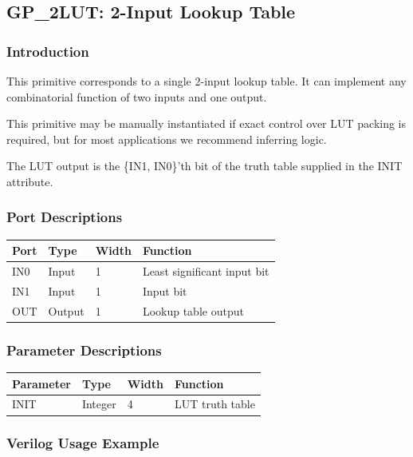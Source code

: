 \documentclass{article}
\begin{document}

\pagebreak
\subsection{GP\_2LUT: 2-Input Lookup Table}

\subsubsection{Introduction}
This primitive corresponds to a single 2-input lookup table. It can implement any combinatorial function of two 
inputs and one output.

This primitive may be manually instantiated if exact control over LUT packing is required, but for most applications we 
recommend inferring logic.

The LUT output is the \{IN1, IN0\}'th bit of the truth table supplied in the INIT attribute.

\subsubsection{Port Descriptions}

\begin{tabularx}{4in}{|l|l|l|X|}
\hline
{\bfseries Port} & {\bfseries Type} & {\bfseries Width} & {\bfseries Function} \\
\hline
IN0 & Input & 1 & Least significant input bit \\
\hline
IN1 & Input & 1 & Input bit \\
\hline
OUT & Output & 1 & Lookup table output \\
\hline
\end{tabularx}

\subsubsection{Parameter Descriptions}

\begin{tabularx}{4in}{|l|l|l|X|}
\hline
{\bfseries Parameter} & {\bfseries Type} & {\bfseries Width} & {\bfseries Function} \\
\hline
INIT & Integer & 4 & LUT truth table \\
\hline
\end{tabularx}

\subsubsection{Verilog Usage Example}
\end{document}
